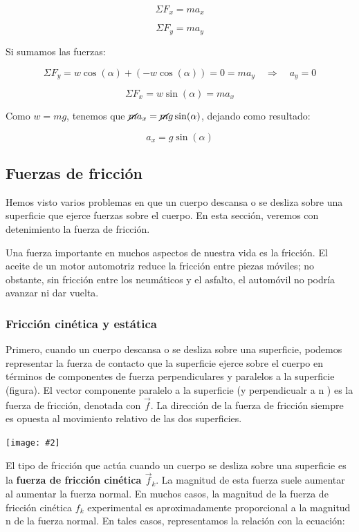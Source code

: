 \documentclass{article}
\newcommand{\newsubsection}[1]{
    \vspace{0.5cm}
    \color{sectionColor}
    \subsection{ #1}
    \color{black}
    \vspace{0.5cm}
}
\newcommand{\newtitle}[1]{
    \color{titleColor}
    \subsubsection{\textbf{#1}}
    \color{black}
}
\newcommand{\bl}[1]{\textbf{#1}}
\newcommand{\ladoALado}[4]{
    \begin{minipage}[t]{#3\textwidth}
        \vspace{0pt}
        #1
    \end{minipage}
    \hfill
    \begin{minipage}[t]{#4\textwidth}
        \vspace{0pt}
        \centering
        \texttt{[image: \#2]}
    \end{minipage}
}
\begin{document}
    \[ \Sigma F_x = m a_x \]

    \[ \Sigma F_y = m a_y \]

    \par Si sumamos las fuerzas:

    \[ \Sigma F_y = w\cos(\alpha) + (-w\cos(\alpha)) = 0 = m a_y \quad \Longrightarrow  \quad a_y = 0 \]

    \[ \Sigma F_x = w\sin(\alpha) = m a_x \]

    \par Como $w = m g$, tenemos que $\cancel{m} a_x = \cancel{m} g \sin(\alpha)$, dejando como resultado:

    \[ a_x = g \sin(\alpha) \]

    \newsubsection{Fuerzas de fricción}

    \par Hemos visto varios problemas en que un cuerpo descansa o se desliza sobre una superficie que ejerce fuerzas sobre el cuerpo. En esta sección, veremos con detenimiento la fuerza de fricción.

    \par Una fuerza importante en muchos aspectos de nuestra vida es la fricción. El aceite de un motor automotriz reduce la fricción entre piezas móviles; no obstante, sin fricción entre los neumáticos y el asfalto, el automóvil no podría avanzar ni dar vuelta.

    \vspace{7cm}

    \newtitle{Fricción cinética y estática}

    \ladoALado{
        \par Primero, cuando un cuerpo descansa o se desliza sobre una superficie, podemos representar la fuerza de contacto que la superficie ejerce sobre el cuerpo en términos de componentes de fuerza perpendiculares y paralelos a la superficie (figura). El vector componente paralelo a la superficie (y perpendicualr a n ) es la fuerza de fricción, denotada con $\vec{f}$. La dirección de la fuerza de fricción siempre es opuesta al movimiento relativo de las dos superficies.
    }{img/3.3-1.png}{0.6}{0.4}

    \par El tipo de fricción que actúa cuando un cuerpo se desliza sobre una superficie es la \bl{fuerza de fricción cinética $\vec{f}_k$}. La magnitud de esta fuerza suele aumentar al aumentar la fuerza normal. En muchos casos, la magnitud de la fuerza de fricción cinética $f_k$ experimental es aproximadamente proporcional a la magnitud n de la fuerza normal. En tales casos, representamos la relación con la ecuación:
\end{document}
